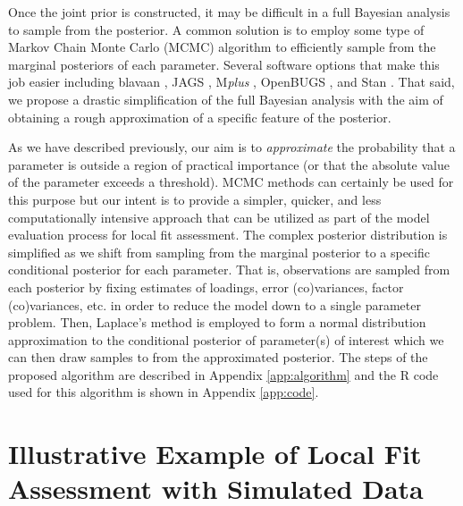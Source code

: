 \documentclass[man, noextraspace, floatsintext, 12pt]{apa7}
\begin{document}
Once the joint prior is constructed, it may be difficult in a full Bayesian analysis to sample from the posterior.
A common solution is to employ some type of Markov Chain Monte Carlo (MCMC) algorithm to efficiently sample from the marginal posteriors of each parameter.
Several software options that make this job easier including blavaan \citep{blavaan}, JAGS \citep{jags}, M\textit{plus} \citep{Mplus}, OpenBUGS \citep{bugs}, and Stan \citep{Stan}.
That said, we propose a drastic simplification of the full Bayesian analysis with the aim of obtaining a rough approximation of a specific feature of the posterior.

As we have described previously, our aim is to \textit{approximate} the probability that a parameter is outside a region of practical importance (or that the absolute value of the parameter exceeds a threshold).
MCMC methods can certainly be used for this purpose but our intent is to provide a simpler, quicker, and less computationally intensive approach that can be utilized as part of the model evaluation process for local fit assessment.
The complex posterior distribution is simplified as we shift from sampling from the marginal posterior to a specific conditional posterior for each parameter.
That is, observations are sampled from each posterior by fixing estimates of loadings, error (co)variances, factor (co)variances, etc. in order to reduce the model down to a single parameter problem.
Then, Laplace's method is employed to form a normal distribution approximation to the conditional posterior of parameter(s) of interest which we can then draw samples to from the approximated posterior.
The steps of the proposed algorithm are described in Appendix \ref{app:algorithm} and the R code used for this algorithm is shown in Appendix \ref{app:code}.


\section{Illustrative Example of Local Fit Assessment with Simulated Data}
\end{document}
